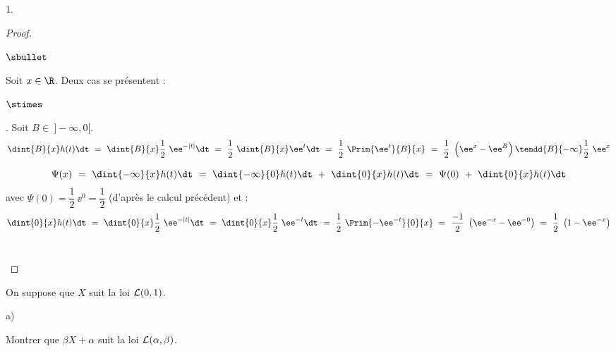\documentclass[11pt]{article}%
\begin{document}
\begin{noliste}{1.}
\begin{proof}
\begin{noliste}{$\sbullet$}
      \newpage


    \item Soit $x \in \R$. Deux cas se présentent :
      \begin{noliste}{$\stimes$}
      \item {}. Soit $B\in \ ]-\infty, 0[$.
        \[
        \dint{B}{x} h(t) \dt \ = \ \dint{B}{x} \dfrac{1}{2} \
        \ee^{-|t|} \dt \ = \ \dfrac{1}{2} \ \dint{B}{x} \ee^{t} \dt \
        = \ \dfrac{1}{2} \ \Prim{\ee^{t}}{B}{x} \ = \ \dfrac{1}{2} \
        \left(\ee^{x} - \ee^{B} \right) \tendd{B}{-\infty}
        \dfrac{1}{2} \ \ee^{x}
        \]
        
      \item {} 
        \[
        \Psi(x) \ = \ \dint{-\infty}{x} h(t) \dt \ = \
        \dint{-\infty}{0} h(t) \dt \ + \ \dint{0}{x} h(t) \dt \ = \
        \Psi(0) \ + \ \dint{0}{x} h(t) \dt
        \]
        avec $\Psi(0) = \dfrac{1}{2} \ \ee^{0} = \dfrac{1}{2}$
        (d'après le calcul précédent) et :
        \[
        \dint{0}{x} h(t) \dt \ = \ \dint{0}{x}
        \dfrac{1}{2} \ \ee^{-|t|} \dt \ = \ \dint{0}{x} \dfrac{1}{2} \
        \ee^{-t} \dt \ = \ \dfrac{1}{2} \ \Prim{-\ee^{-t}}{0}{x} \ = \
        \dfrac{-1}{2} \ \left(\ee^{-x} - \ee^{-0} \right) \ = \
        \dfrac{1}{2} \ \left(1 - \ee^{-x} \right)
        \]
        ~\\[-1.2cm]
      \end{noliste}      
    \end{noliste}
  \end{proof}
  
\item On suppose que $X$ suit la loi ${\cal L} (0,1)$.
  
  \begin{noliste}{a)}
    \setlength{\itemsep}{2mm} %
  \item Montrer que $\beta X+\alpha$ suit la loi ${\cal
      L}(\alpha,\beta)$.


\end{noliste}
\end{noliste}
\end{document}
